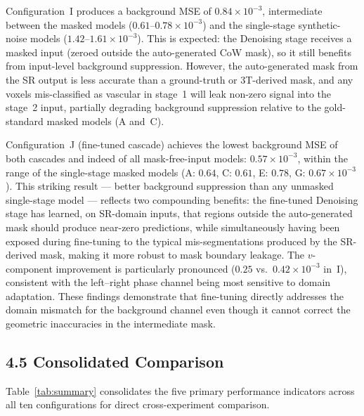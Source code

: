 \documentclass[11pt]{article}
\begin{document}
Configuration~I produces a background MSE of $0.84{\times}10^{-3}$, intermediate between the
masked models ($0.61$--$0.78{\times}10^{-3}$) and the single-stage synthetic-noise models
($1.42$--$1.61{\times}10^{-3}$).  This is expected: the Denoising stage receives a masked input
(zeroed outside the auto-generated CoW mask), so it still benefits from input-level background
suppression.  However, the auto-generated mask from the SR output is less accurate than a
ground-truth or 3T-derived mask, and any voxels mis-classified as vascular in stage~1 will leak
non-zero signal into the stage~2 input, partially degrading background suppression relative to
the gold-standard masked models (A and~C).

Configuration~J (fine-tuned cascade) achieves the lowest background MSE of both cascades
and indeed of all mask-free-input models: $0.57{\times}10^{-3}$, within the range of the
single-stage masked models (A: $0.64$, C: $0.61$, E: $0.78$, G: $0.67{\times}10^{-3}$).
This striking result --- better background suppression than any unmasked single-stage model ---
reflects two compounding benefits: the fine-tuned Denoising stage has learned, on SR-domain
inputs, that regions outside the auto-generated mask should produce near-zero predictions, while
simultaneously having been exposed during fine-tuning to the typical mis-segmentations produced
by the SR-derived mask, making it more robust to mask boundary leakage.  The $v$-component
improvement is particularly pronounced ($0.25$ vs.\ $0.42{\times}10^{-3}$ in~I), consistent
with the left--right phase channel being most sensitive to domain adaptation.  These findings
demonstrate that fine-tuning directly addresses the domain mismatch for the background channel
even though it cannot correct the geometric inaccuracies in the intermediate mask.

\subsection*{4.5 Consolidated Comparison}

Table~\ref{tab:summary} consolidates the five primary performance indicators across all ten
configurations for direct cross-experiment comparison.
\end{document}
